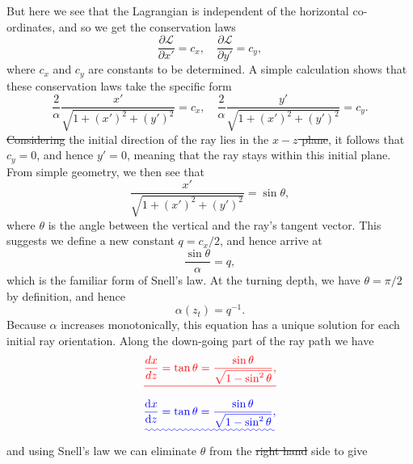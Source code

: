 \documentclass[a4paper,10pt]{paper}
\providecommand{\DIFadd}[1]{{\protect\color{blue}\uwave{#1}}} %
\providecommand{\DIFdel}[1]{{\protect\color{red}\sout{#1}}}                      %
\providecommand{\DIFaddbegin}{} %
\providecommand{\DIFaddend}{} %
\providecommand{\DIFdelbegin}{} %
\providecommand{\DIFdelend}{} %
\begin{document}
\begin{enumerate}
\begin{equation*}
{}\end{equation*}\DIFaddend 
But here we see that the Lagrangian is independent of the horizontal co-ordinates, and so we get the conservation laws
\begin{equation*}
    \frac{\partial\mathscr{L}}{\partial x'}=c_{x}, \quad \frac{\partial\mathscr{L}}{\partial y'}=c_{y},
\end{equation*}
where $c_{x}$ and $c_{y}$ are constants to be determined. A simple calculation shows that these conservation laws take the specific form
\begin{equation*}
    \frac{2}{\alpha}\frac{x'}{\sqrt{1+(x')^{2}+(y')^{2}}}=c_{x},\quad \frac{2}{\alpha}\frac{y'}{\sqrt{1+(x')^{2}+(y')^{2}}}=c_{y}.
\end{equation*}
\DIFdelbegin \DIFdel{Considering }\DIFdelend \DIFaddbegin \DIFadd{Since }\DIFaddend the initial direction of the ray lies in the \DIFdelbegin \DIFdel{$x-z$ plane}\DIFdelend \DIFaddbegin \DIFadd{$(x,z)$-plane}\DIFaddend , it follows that $c_{y}=0$, and hence $y'=0$, meaning that the ray stays within this initial plane. From simple geometry, we then see that
\begin{equation*}
    \frac{x'}{\sqrt{1+(x')^{2}+(y')^{2}}}=\sin\theta,
\end{equation*}
where $\theta$ is the angle between the vertical and the ray's tangent vector. This suggests we define a new constant $q=c_{x}/2$, and hence arrive at
\begin{equation*}
    \frac{\sin\theta}{\alpha}=q,
\end{equation*}
which is the familiar form of Snell's law. At the turning depth, we have $\theta=\pi/2$ by definition, and hence
\begin{equation*}
    \alpha(z_{t})=q^{-1}.
\end{equation*}
Because $\alpha$ increases monotonically, this equation has a unique solution for each initial ray orientation. Along the down-going part of the ray path we have
\DIFdelbegin \begin{displaymath}
    \DIFdel{\frac{dx}{dz}=\tan\theta=\frac{\sin\theta}{\sqrt{1-\sin^{2}\theta}},
}\end{displaymath}%
\DIFdelend \DIFaddbegin \begin{equation*}
    \DIFadd{\frac{\ddns x}{\ddns z}=\tan\theta=\frac{\sin\theta}{\sqrt{1-\sin^{2}\theta}},
}\end{equation*}\DIFaddend 
and using Snell's law we can eliminate $\theta$ from the \DIFdelbegin \DIFdel{right hand }\DIFdelend \DIFaddbegin \DIFadd{right-hand }\DIFaddend side to give

\end{enumerate}
\end{document}
